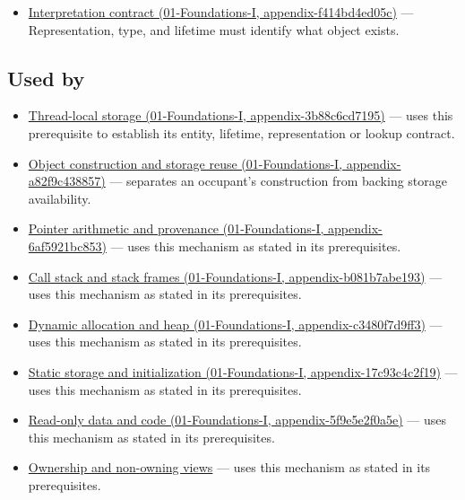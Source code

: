 \begin{itemize}
\tightlist
\item
  \href{../01-Foundations-I/main.pdf\#nameddest=appendix-f414bd4ed05c}{Interpretation contract (01-Foundations-I, appendix-f414bd4ed05c)} --- Representation, type, and lifetime must identify what object exists.
\end{itemize}

\subsection{Used by}\label{appendix-0b104bcba06b-used-by}

\begin{itemize}
\tightlist
\item
  \href{../01-Foundations-I/main.pdf\#nameddest=appendix-3b88c6cd7195}{Thread-local storage (01-Foundations-I, appendix-3b88c6cd7195)} --- uses this prerequisite to establish its entity, lifetime, representation or lookup contract.
\item
  \href{../01-Foundations-I/main.pdf\#nameddest=appendix-a82f9c438857}{Object construction and storage reuse (01-Foundations-I, appendix-a82f9c438857)} --- separates an occupant's construction from backing storage availability.
\item
  \href{../01-Foundations-I/main.pdf\#nameddest=appendix-6af5921bc853}{Pointer arithmetic and provenance (01-Foundations-I, appendix-6af5921bc853)} --- uses this mechanism as stated in its prerequisites.
\item
  \href{../01-Foundations-I/main.pdf\#nameddest=appendix-b081b7abe193}{Call stack and stack frames (01-Foundations-I, appendix-b081b7abe193)} --- uses this mechanism as stated in its prerequisites.
\item
  \href{../01-Foundations-I/main.pdf\#nameddest=appendix-c3480f7d9ff3}{Dynamic allocation and heap (01-Foundations-I, appendix-c3480f7d9ff3)} --- uses this mechanism as stated in its prerequisites.
\item
  \href{../01-Foundations-I/main.pdf\#nameddest=appendix-17c93c4c2f19}{Static storage and initialization (01-Foundations-I, appendix-17c93c4c2f19)} --- uses this mechanism as stated in its prerequisites.
\item
  \href{../01-Foundations-I/main.pdf\#nameddest=appendix-5f9e5e2f0a5e}{Read-only data and code (01-Foundations-I, appendix-5f9e5e2f0a5e)} --- uses this mechanism as stated in its prerequisites.
\item
  \hyperref[appendix-d52e4486f527]{Ownership and non-owning views} --- uses this mechanism as stated in its prerequisites.

\end{itemize}
